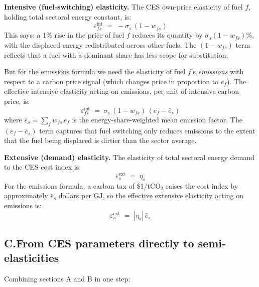 \documentclass[11pt,a4paper]{article}
\begin{document}
\textbf{Intensive (fuel-switching) elasticity.} The CES own-price elasticity of fuel $f$, holding total sectoral energy constant, is:
\begin{equation}
\varepsilon^{\mathrm{int}}_{fs} \;=\; -\sigma_s\,(1 - w_{fs})
\end{equation}
This says: a 1\% rise in the price of fuel $f$ reduces its quantity by $\sigma_s(1-w_{fs})$\%, with the displaced energy redistributed across other fuels. The $(1-w_{fs})$ term reflects that a fuel with a dominant share has less scope for substitution.

But for the emissions formula we need the elasticity of fuel $f$'s \emph{emissions} with respect to a carbon price signal (which changes price in proportion to $e_f$). The effective intensive elasticity acting on emissions, per unit of intensive carbon price, is:
\begin{equation}
\varepsilon^{\mathrm{int}}_{fs} \;=\; \sigma_s\,(1 - w_{fs})\,(e_f - \bar{e}_s)
\end{equation}
where $\bar{e}_s = \sum_f w_{fs}\,e_f$ is the energy-share-weighted mean emission factor. The $(e_f - \bar{e}_s)$ term captures that fuel switching only reduces emissions to the extent that the fuel being displaced is dirtier than the sector average.

\textbf{Extensive (demand) elasticity.} The elasticity of total sectoral energy demand to the CES cost index is:
\begin{equation}
\varepsilon^{\mathrm{ext}}_s \;=\; \eta_s
\end{equation}
For the emissions formula, a carbon tax of \$1/tCO$_2$ raises the cost index by approximately $\bar{e}_s$ dollars per GJ, so the effective extensive elasticity acting on emissions is:
\begin{equation}
\varepsilon^{\mathrm{ext}}_s \;=\; |\eta_s|\,\bar{e}_s
\end{equation}


\subsection*{C.\quad From CES parameters directly to semi-elasticities}

Combining sections A and B in one step:

\vspace{0.5em}
\end{document}
